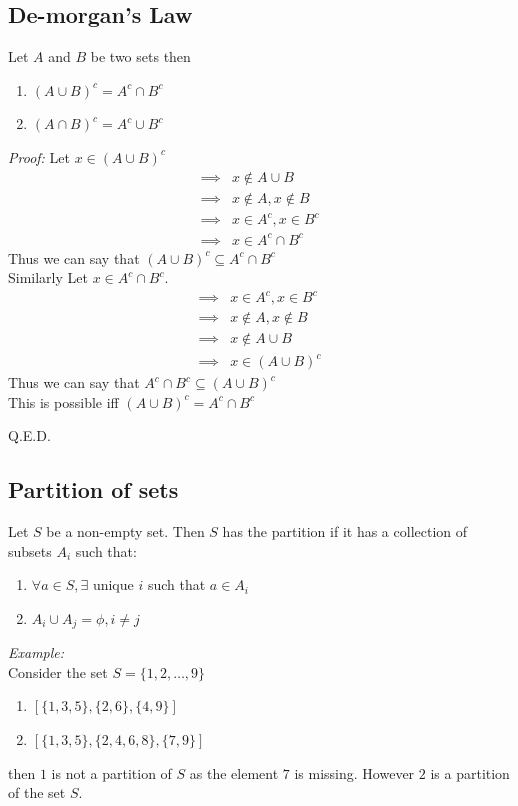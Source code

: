 \documentclass[11pt,letterpaper]{article}
\newenvironment{myproof} 
        {\textit{Proof:}}                                   
        {\begin{flushright} Q.E.D. \end{flushright}}
\newenvironment{example}                             
        {\textit{Example:}\\}
	{}
\begin{document}
\subsection{De-morgan's Law}
Let $A$ and $B$ be two sets then 
\begin{enumerate}
  \item $(A\cup B)^c = A^c \cap B^c$
  \item $(A\cap B)^c = A^c \cup B^c$
\end{enumerate}
\begin{myproof}
  Let $x \in (A \cup B)^c$ 
  \begin{align*}
    \implies & x \not \in A \cup B \\ 
    \implies & x \not \in A, x \not\in B \\
    \implies & x \in A^c , x \in B^c \\ 
    \implies & x \in A^c \cap B^c 
  \end{align*}
  Thus we can say that $(A\cup B)^c \subseteq A^c \cap B^c$\\
  Similarly Let $x \in A^c \cap B^c$.
  \begin{align*}
    \implies & x \in A^c , x \in B^c \\ 
    \implies & x \not \in A, x \not\in B \\
    \implies & x \not \in A \cup B \\ 
    \implies & x \in (A\cup B)^c
  \end{align*}
  Thus we can say that $A^c \cap B^c\subseteq(A\cup B)^c $\\
  This is possible iff $(A\cup B)^c = A^c \cap B^c$
\end{myproof}

\subsection{Partition of sets}
Let $S$ be a non-empty set. Then $S$ has the partition if it has a collection of subsets $A_i$ such that:
\begin{enumerate}
  \item $\forall a \in S, \exists $ unique $i$ such that $a \in A_i$
  \item $A_i \cup A_j = \phi, i \neq j$
\end{enumerate}
\begin{example}
  Consider the set $S = \{ 1,2, \dots, 9\}$\\ 
  \begin{enumerate}
    \item $[\{1,3,5\},\{2,6\},\{4,9\}]$
    \item $[\{1,3,5\},\{2,4,6,8\},\{7,9\}]$
  \end{enumerate}
  then $1$ is not a partition of $S$ as the element $7$ is missing. However $2$ is a partition of the set $S$.
\end{example}
\end{document}
